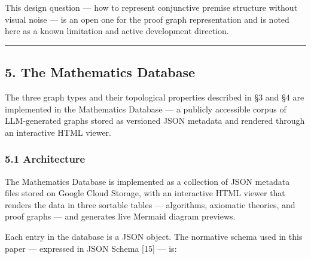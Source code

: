 \documentclass[
  11pt]{article}
\begin{document}
This design question --- how to represent conjunctive premise structure
without visual noise --- is an open one for the proof graph
representation and is noted here as a known limitation and active
development direction.

\begin{center}\rule{0.5\linewidth}{0.5pt}\end{center}

\hypertarget{5-the-mathematics-database}{%
\subsection{5. The Mathematics
Database}\label{5-the-mathematics-database}}

The three graph types and their topological properties described in §3
and §4 are implemented in the Mathematics Database --- a publicly
accessible corpus of LLM-generated graphs stored as versioned JSON
metadata and rendered through an interactive HTML viewer.

\hypertarget{51-architecture}{%
\subsubsection{5.1 Architecture}\label{51-architecture}}

The Mathematics Database is implemented as a collection of JSON metadata
files stored on Google Cloud Storage, with an interactive HTML viewer
that renders the data in three sortable tables --- algorithms, axiomatic
theories, and proof graphs --- and generates live Mermaid diagram
previews.

Each entry in the database is a JSON object. The normative schema used
in this paper --- expressed in JSON Schema {[}15{]} --- is:
\end{document}
